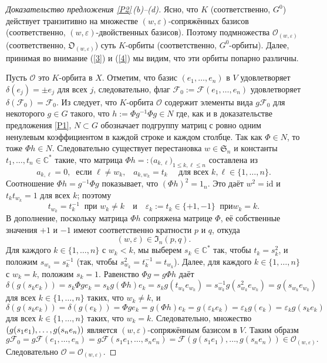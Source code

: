 \documentclass{amsart}
\theoremstyle{definition}
\begin{document}
\begin{proof}[Доказательство предложения \ref{P2}\,{\rm (b)}--{\rm (d)}]
Ясно, что $K$ (соответственно, $G^0$) действует транзитивно на множестве
$(w,\varepsilon)$-сопряжённых базисов (соответственно, $(w,\varepsilon)$-двойственных
базисов). Поэтому подмножества $\mathcal{O}_{(w,\varepsilon)}$ (соответственно,
$\mathfrak{O}_{(w,\varepsilon)}$) суть  $K$-орбиты (соответственно,
$G^0$-орбиты). Далее, принимая во внимание (\ref{3}) и (\ref{4}) мы видим, что эти орбиты попарно различны.

Пусть $\mathcal{O}$ это  $K$-орбита в $X$. Отметим, что базис $(e_1,\ldots,e_n)$ в
$V$ удовлетворяет $\delta(e_j)=\pm
e_j$ для всех $j$, следовательно, флаг
$\mathcal{F}_0:=\mathcal{F}(e_1,\ldots,e_n)$ удовлетворяет
$\delta(\mathcal{F}_0)=\mathcal{F}_0$. Из
\cite{Richardson-Springer} следует, что  $K$-орбита $\mathcal{O}$ содержит элементы вида $g\mathcal{F}_0$ для некоторого $g\in G$ такого, что
$h:=\Phi g^{-1}\Phi g\in N$ где, как и в доказательстве предложения
\ref{P1}, $N\subset G$ обозначает подгруппу матриц с ровно
одним ненулевым коэффициентом в каждой строке и каждом столбце. Так как
$\Phi\in N$, то тоже $\Phi h\in N$. Следовательно существует перестановка
$w\in\mathfrak{S}_n$ и константы
$t_1,\ldots,t_n\in\mathbb{C}^*$ такие, что матрица $\Phi
h=:\big(a_{k,\ell}\big)_{1\leq k,\ell\leq n}$ составлена из
\[a_{k,\ell}=0,\ \mbox{ если $\ell\not=w_k$,}\quad a_{k,w_k}=t_k\quad\mbox{ для всех $k,\ell\in\{1,\ldots,n\}$}.\]
Соотношение $\Phi h=g^{-1}\Phi g$ показывает, что $(\Phi h)^2=1_n$. Это
даёт $w^2=\mathrm{id}$ и $t_kt_{w_k}=1$ для всех $k$; поэтому
\[t_{w_k}=t_k^{-1}\ \mbox{ при $w_k\not=k$}\quad\mbox{и}\quad \varepsilon_k:=t_k\in\{+1,-1\}\ \mbox{ при
$w_k=k$}.\] В дополнение, поскольку матрица $\Phi h$ сопряжена матрице $\Phi$, её собственные значения $+1$ и $-1$ имеют соответственно кратности $p$ и
$q$, откуда
\[(w,\varepsilon)\in\mathfrak{I}_n(p,q).\]
Для каждого $k\in\{1,\ldots,n\}$ с $w_k<k$, мы
выберем  $s_k\in\mathbb{C}^*$ так, чтобы $t_k=s_k^2$, и положим
$s_{w_k}=s_k^{-1}$ (так, чтобы $s_{w_k}^2=t_k^{-1}=t_{w_k}$). Далее,
для каждого $k\in\{1,\ldots,n\}$ с $w_k=k$, положим $s_k=1$. Равенство $\Phi g=g\Phi h$ даёт
\[
\delta(g(s_ke_k))=s_k\Phi g e_k=s_k g(\Phi h)e_k=s_k
g(t_{w_k}e_{w_k})=s_{w_k}^{-1}
g(s_{w_k}^2e_{w_k})=g(s_{w_k}e_{w_k})
\]
для всех $k\in\{1,\ldots,n\}$ таких, что $w_k\not=k$, и
\[
\delta(g(s_k e_k))=\delta(g(e_k))=\Phi g e_k=g(\Phi
h)e_k=g(\varepsilon_k e_k)=\varepsilon_k g(e_k)=\varepsilon_k g(s_k
e_k)
\]
для всех $k\in\{1,\ldots,n\}$ таких, что $w_k=k$. Следовательно, множество
$(g(s_1 e_1),\ldots,\\g(s_n e_n))$ является $(w,\varepsilon)$-сопряжённым базисом в
$V$. Таким образм
\[g\mathcal{F}_0=g\mathcal{F}(e_1,\ldots,e_n)=g\mathcal{F}(s_1 e_1,\ldots,s_n e_n)=\mathcal{F}(g(s_1 e_1),\ldots,g(s_n e_n))\in\mathcal{O}_{(w,\varepsilon)}.\]
Следовательно $\mathcal{O}=\mathcal{O}_{(w,\varepsilon)}$.


\end{proof}
\end{document}
